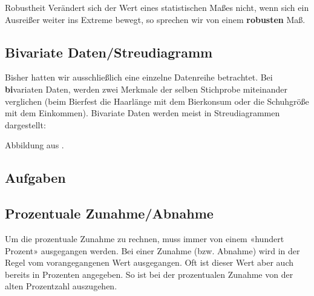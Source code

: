 \begin{definition}{Robustheit}{}
Verändert sich der Wert eines statistischen Maßes nicht, wenn sich ein
Ausreißer weiter ins Extreme bewegt, so sprechen wir von einem \textbf{robusten} Maß.
\end{definition}
\newpage


\subsection{Bivariate Daten/Streudiagramm}
Bisher hatten wir ausschließlich eine einzelne Datenreihe
betrachtet. 
Bei \textbf{bi}variaten Daten, werden zwei Merkmale der selben Stichprobe miteinander verglichen (\zB beim Bierfest die Haarlänge mit dem Bierkonsum oder die Schuhgröße mit dem Einkommen). Bivariate Daten werden meist in Streudiagrammen dargestellt:



Abbildung aus \cite{marthaler21alg}.
\newpage


\subsection*{Aufgaben}







\newpage




\subsection{Prozentuale Zunahme/Abnahme}\index{\%}
Um die prozentuale Zunahme zu rechnen, muss immer von einem «hundert
Prozent» ausgegangen werden. Bei einer Zunahme (bzw. Abnahme) wird in
der Regel vom vorangegangenen Wert ausgegangen. Oft ist dieser Wert
aber auch bereits in Prozenten angegeben. So ist bei der prozentualen
Zunahme von der alten Prozentzahl auszugehen.

